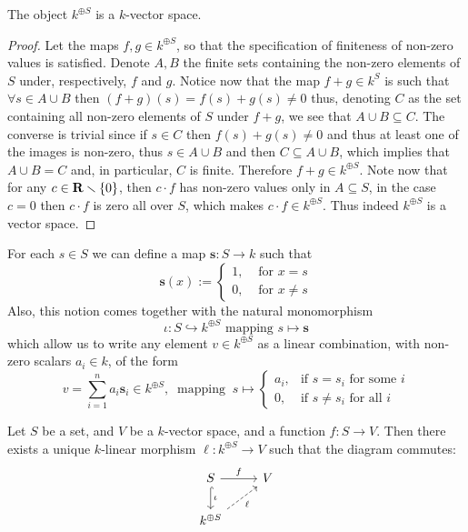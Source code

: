 \begin{proposition}
   The object \(k^{\oplus S}\) is a \(k\)-vector space.
\end{proposition}

\begin{proof}
   Let the maps \(f, g \in k^{\oplus S}\), so that the specification of
   finiteness of non-zero values is satisfied. Denote \(A, B\) the finite sets
   containing the non-zero elements of \(S\) under, respectively, \(f\) and
   \(g\). Notice now that the map \(f + g \in k^S\) is such that \(\forall s \in
   A \cup B\) then \((f+g)(s) = f(s)+g(s) \neq  0\) thus, denoting \(C\) as the
   set containing all non-zero elements of \(S\) under \(f + g\), we see that \(A
   \cup B \subseteq C\). The converse is trivial since if \(s \in C\) then
   \(f(s) + g(s) \neq 0\) and thus at least one of the images is non-zero, thus
   \(s \in A \cup B\) and then \(C \subseteq  A \cup B\), which implies that \(A
   \cup B = C\) and, in particular, \(C\) is finite. Therefore \(f + g \in
   k^{\oplus S}\). Note now that for any \(c \in \mathbf{R} \smallsetminus \{0\}\),
   then \(c \cdot f\) has non-zero values only in \(A \subseteq S\), in the case
   \(c = 0\) then  \(c \cdot f\) is zero all over \(S\), which makes \(c \cdot f
   \in k^{\oplus S}\). Thus indeed \(k^{\oplus S}\) is a vector space.
\end{proof}

For each \(s \in S\) we can define a map \(\mathbf{s} : S \to k\) such that
\[
   \mathbf{s}(x) :=
   \begin{cases}
      1, &\text{ for } x = s\\
      0, &\text{ for } x \neq s
   \end{cases}
\]
Also, this notion comes together with the natural monomorphism
\[
   \iota : S \hookrightarrow k^{\oplus S} \text{ mapping } s \mapsto \mathbf{s}
\]
which allow us to write any element \(v \in k^{\oplus S}\) as a linear
combination, with non-zero scalars \(a_i \in k\), of the form
\[
   v = \sum_{i=1}^n a_i \mathbf{s}_i \in k^{\oplus S},\
   \text{ mapping }\ s \mapsto
   \begin{cases}
      a_i, &\text{if } s = s_i \text{ for some } i \\
      0, &\text{if } s \neq s_i \text{ for all } i
   \end{cases}
\]

\begin{proposition}
  \label{prop: universal property free vs}
  Let \(S\) be a set, and \(V\) be a \(k\)-vector space, and a function \(f : S
  \to V\). Then there exists a unique \(k\)-linear morphism \(\ell : k^{\oplus
  S} \to V\) such that the diagram commutes:
   \[
     \begin{tikzcd}
       S \ar[r, "f"] \ar[d, hook, "\iota"] &V \\
       k^{\oplus S} \ar[ru, dashed, swap, "\ell"]
     \end{tikzcd}
   \]
\end{proposition}

